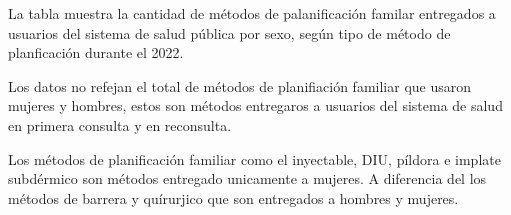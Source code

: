 La tabla muestra la cantidad de métodos de palanificación familar entregados a usuarios del sistema de salud pública por sexo, según tipo de método de planficación durante el 2022. 

Los datos no refejan el total de métodos de planifiación familiar que usaron mujeres y hombres, estos son métodos entregaros a usuarios del sistema de salud en primera consulta y en reconsulta. 

Los métodos de planificación familiar como el inyectable, DIU, píldora e implate subdérmico son métodos entregado unicamente a mujeres. A diferencia del los métodos de barrera y quírurjico que son entregados a hombres y mujeres. 